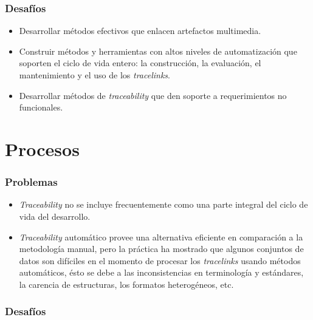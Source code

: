 \documentclass[a4paper,12pt,oneside,spanish]{book}
\begin{document}
\subsubsection{Desafíos}

\begin{itemize}[label={\checkmark}]

\item Desarrollar métodos efectivos que enlacen artefactos multimedia.

\item Construir métodos y herramientas con altos niveles de automatización que soporten el ciclo de vida entero: la construcción, la evaluación, el mantenimiento y el uso de los \textit{tracelinks}.

\item Desarrollar métodos de \textit{traceability} que den soporte a requerimientos no funcionales.

\end{itemize}

\section{Procesos}

\subsubsection{Problemas}

\begin{itemize}[label={$\times$}]

\item \textit{Traceability} no se incluye frecuentemente como una parte integral del ciclo de vida del desarrollo.

\item \textit{Traceability} automático provee una alternativa eficiente en comparación a la metodología manual, pero la práctica ha mostrado que algunos conjuntos de datos son difíciles en el momento de procesar los \textit{tracelinks} usando métodos automáticos, ésto se debe a las inconsistencias en terminología y estándares, la carencia de estructuras, los formatos heterogéneos, etc.

\end{itemize}

\subsubsection{Desafíos}
\end{document}
